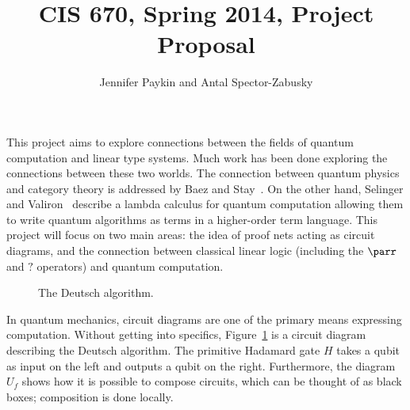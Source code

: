 \documentclass{article}
\title{CIS 670, Spring 2014, Project Proposal}
\author{Jennifer Paykin and Antal Spector-Zabusky}
\newcommand{\qubit}[1]{\vert #1 \rangle}
\begin{document}
\maketitle

This project aims to explore connections between the fields
of quantum computation and linear type systems. Much work has been
done exploring the connections between these two worlds. The connection
between quantum physics and category theory is addressed by 
Baez and Stay~\cite{baez2011physics}. On the other hand, 
Selinger and Valiron~\cite{selinger2009quantum} describe a lambda
calculus for quantum computation allowing them to write quantum
algorithms as terms in a higher-order term language. This project
will focus on two main areas: the idea of proof nets acting as circuit diagrams,
and the connection between classical linear logic (including the $\parr$ and $?$ operators)
and quantum computation.

\begin{figure}
\begin{center}  \end{center}
\caption{The Deutsch algorithm.
\label{fig:deutsch}}
\end{figure}

In quantum mechanics, circuit diagrams are one of the primary means
expressing computation. Without getting into specifics, 
Figure~\ref{fig:deutsch} is a circuit diagram describing the Deutsch algorithm.
The primitive Hadamard gate $H$ takes a qubit as input on the left
and outputs a qubit on the right. Furthermore, the diagram
$U_f$ shows how it is possible to compose circuits, which can be thought of as
black boxes; composition is done locally.
\end{document}
